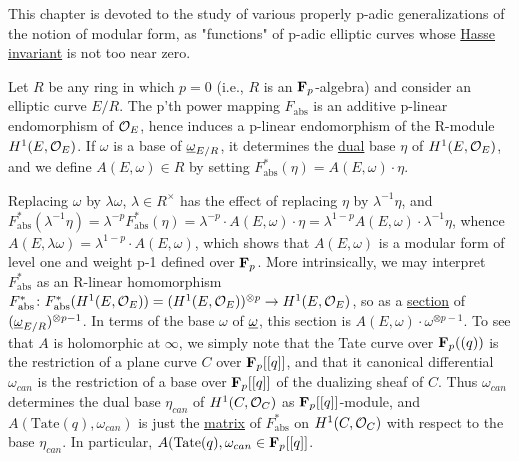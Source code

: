 
This chapter is devoted to the study of various properly p-adic generalizations
of the notion of modular form, as "functions" of p-adic elliptic curves whose
\uline{Hasse invariant} is not too near zero.


Let $R$ be any ring in which $p=0$ (i.e., $R$ is an $\mathbf{F}_p$-algebra) and consider
an elliptic curve $E/R$. The p'th power mapping $F_{\mathrm{abs}}$ is an
additive p-linear endomorphism of $\mathcal{O}_E$, hence induces a p-linear
endomorphism of the R-module $H^1(E,\mathcal{O}_E)$. If $\omega$ is a base of
$\underline{\omega}_{E/R}$, it determines the \uline{dual} base $\eta$ of $H^1(E,\mathcal{O}_E)$, and we
define $A(E,\omega)\in R$ by setting
$F_{\mathrm{abs}}^*(\eta) = A(E,\omega)\cdot\eta$.

Replacing $\omega$ by $\lambda\omega$, $\lambda\in R^\times$ has the effect of
replacing $\eta$ by $\lambda^{-1}\eta$, and
$F_{\mathrm{abs}}^*(\lambda^{-1}\eta) =
\lambda^{-p}F_{\mathrm{abs}}^*(\eta) =
\lambda^{-p}\cdot A(E,\omega)\cdot\eta =
\lambda^{1-p}A(E,\omega)\cdot\lambda^{-1}\eta$, whence
$A(E,\lambda\omega) = \lambda^{1-p}\cdot A(E,\omega)$, which shows that
$A(E,\omega)$ is a modular form of level one and weight p-1 defined over
$\mathbf{F}_p$. More intrinsically, we may interpret $F_{\mathrm{abs}}^*$ as an
R-linear homomorphism
$F_{\mathrm{abs}}^*\colon F_{\mathrm{abs}}^*(H^1(E,\mathcal{O}_E)) =
(H^1(E,\mathcal{O}_E))^{\otimes p}\to H^1(E,\mathcal{O}_E)$, so as a \uline{section} of
$(\underline{\omega}_{E/R})^{\otimes p-1}$. In terms of the base $\omega$ of $\underline{\omega}$, this section
is $A(E,\omega)\cdot\omega^{\otimes p-1}$. To see that $A$ is holomorphic at
$\infty$, we simply note that the Tate curve over $\mathbf{F}_p((q))$ is the
restriction of a plane curve $C$ over $\mathbf{F}_p[[q]]$, and that it canonical
differential $\omega_{can}$ is the restriction of a base over $\mathbf{F}_p[[q]]$ of
the dualizing sheaf of $C$. Thus $\omega_{can}$ determines the dual base
$\eta_{can}$ of $H^1(C,\mathcal{O}_C)$ as $\mathbf{F}_p[[q]]$-module, and
$A(\mathrm{Tate}(q),\omega_{can})$ is just the \uline{matrix} of
$F_{\mathrm{abs}}^*$ on $H^1(C,\mathcal{O}_C)$ with respect to the base $\eta_{can}$.
In particular, $A(\mathrm{Tate}(q),\omega_{can}\in\mathbf{F}_p[[q]]$.

